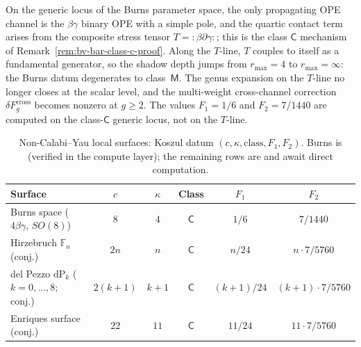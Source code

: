 \begin{remark}
\label{rem:burns-shadow-class}
On the generic locus of the Burns parameter space, the only
propagating OPE channel is the $\beta\gamma$ binary OPE with a
simple pole, and the quartic contact term arises from the composite
stress tensor $T = {:}\!\beta\partial\gamma\!{:}$; this is the class
$\mathsf{C}$ mechanism of
Remark~\ref{rem:bv-bar-class-c-proof}. Along the $T$-line, $T$
couples to itself as a fundamental generator, so the shadow depth
jumps from $r_{\max} = 4$ to $r_{\max} = \infty$: the Burns datum
degenerates to class~$\mathsf{M}$. The genus expansion on the
$T$-line no longer closes at the scalar level, and the
multi-weight cross-channel correction $\delta F_g^{\mathrm{cross}}$
becomes nonzero at $g \geq 2$. The values
$F_1 = 1/6$ and $F_2 = 7/1440$ are computed on the class-$\mathsf{C}$
generic locus, not on the $T$-line.
\end{remark}

\begin{table}[htbp]
\caption{Non-Calabi--Yau local surfaces: Koszul datum
$(c, \kappa, \mathrm{class}, F_1, F_2)$. Burns is
\ClaimStatusProvedElsewhere{} \textup{(}verified in the compute
layer\textup{)}; the remaining rows are \ClaimStatusConjectured{}
and await direct computation.}
\label{tab:non-cy-local-surfaces}
\begin{center}
\small
\renewcommand{\arraystretch}{1.20}
\begin{tabular}{lccccc}
\toprule
Surface & $c$ & $\kappa$ & Class & $F_1$ & $F_2$ \\
\midrule
Burns space \textup{(}$4\beta\gamma$, $SO(8)$\textup{)}
 & $8$ & $4$ & $\mathsf{C}$
 & $1/6$ & $7/1440$ \\[1pt]
Hirzebruch $\mathbb{F}_n$ \textup{(}conj.\textup{)}
 & $2n$ & $n$ & $\mathsf{C}$
 & $n/24$ & $n \cdot 7/5760$ \\[1pt]
del Pezzo $\mathrm{dP}_k$ \textup{(}$k=0,\ldots,8$; conj.\textup{)}
 & $2(k{+}1)$ & $k{+}1$ & $\mathsf{C}$
 & $(k{+}1)/24$ & $(k{+}1) \cdot 7/5760$ \\[1pt]
Enriques surface \textup{(}conj.\textup{)}
 & $22$ & $11$ & $\mathsf{C}$
 & $11/24$ & $11 \cdot 7/5760$ \\
\bottomrule
\end{tabular}
\end{center}
\end{table}

